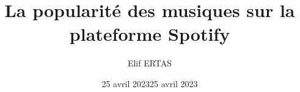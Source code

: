 \documentclass[french,]{compterendu}
\title{La popularité des musiques sur la plateforme Spotify}
\author{Elif ERTAS}
\date{25 avril 2023}
\date{25 avril 2023}
\theoremstyle{urcastyle}
\theoremstyle{remark}
\begin{document}

\newtheorem{lemme}{Lemme}[section]
\newtheorem{theoreme}{Théorème}[section]
\newtheorem{corollaire}{Corollaire}[section]
\newtheorem{propriete}{Propriété}[section]
\newtheorem{proprietes}{Propriétés}[section]



\maketitle

% 
% 
\end{document}

